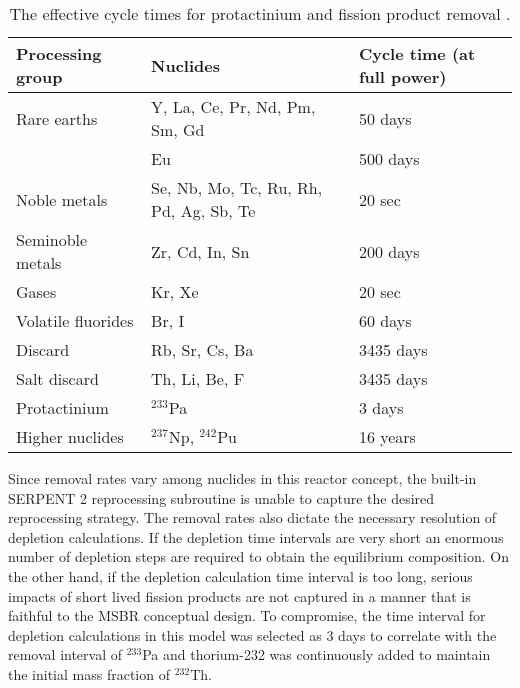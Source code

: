 \begin{table}[ht!]
        \centering
        \caption{The effective cycle times for protactinium and fission product removal \cite{robertson_conceptual_1971}.}
        \begin{tabular}{|m{} | m{}|m{}|}
        \hline 
        Processing group & \qquad\qquad\qquad Nuclides & Cycle time (at full power) \\ [5pt] \hline 
        Rare earths & Y, La, Ce, Pr, Nd, Pm, Sm, Gd & 50 days \\ [5pt] \hline 
        \qquad & Eu & 500 days \\ [5pt] \hline
        Noble metals & Se, Nb, Mo, Tc, Ru, Rh, Pd, Ag, Sb, Te & 20 sec \\ [5pt] \hline
        Seminoble metals & Zr, Cd, In, Sn & 200 days \\ [5pt] \hline
        Gases & Kr, Xe & 20 sec \\ [5pt] \hline
        Volatile fluorides & Br, I & 60 days \\ [5pt] \hline
        Discard & Rb, Sr, Cs, Ba & 3435 days \\ [5pt] \hline
        Salt discard & Th, Li, Be, F & 3435 days \\ [5pt] \hline
        Protactinium & $^{233}$Pa & 3 days \\ [5pt] \hline
        Higher nuclides & $^{237}$Np, $^{242}$Pu & 16 years \\ [5pt] \hline
        \end{tabular}
        \label{tab:reprocessing_list}
          \vspace{-0.9em}
\end{table}
Since removal rates vary among nuclides in this reactor concept, the built-in SERPENT 2 reprocessing subroutine is unable to capture the desired reprocessing strategy. The removal rates also dictate the necessary resolution of depletion calculations. If the depletion time intervals are very short an enormous number of depletion steps are required to obtain the equilibrium composition. On the other hand, if the depletion  calculation time interval is too long, serious impacts of short lived fission products are not captured in a manner that is faithful to the \gls{MSBR} conceptual design. To compromise, the time interval for depletion calculations in this model was selected as 3 days to correlate with the removal interval of $^{233}$Pa and thorium-232 was continuously added to maintain the initial mass fraction of $^{232}$Th.

